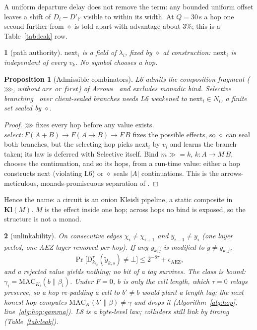 \documentclass[journal]{IEEEtran}
\newtheorem{proposition}{Proposition}
\newcommand{\namedhead}{}
\newtheorem*{namedenv}{\namedhead}
\newenvironment{lawL}[2]{\renewcommand{\namedhead}{Law #1}%
  \begin{namedenv}[#2]}{\end{namedenv}}
\newcommand{\then}{\mathbin{\ggg}}
\newcommand{\Kl}{\mathbf{Kl}}
\newcommand{\cl}{\diamond}
\newcommand{\Dec}[2]{\mathrm{D}^{#1}_{#2}}
\newcommand{\nxt}{\mathrm{next}}
\newcommand{\MAC}{\mathrm{MAC}}
\begin{document}
A uniform departure delay does not remove the term: any bounded uniform
offset leaves a shift of $D_i-D'_{i'}$ visible to within its width.  At
$Q=30$\,s a hop one second further from $\cl$ is told apart with
advantage about $3\%$; this is a Table~\ref{tab:leak} row.

\begin{lawL}{L6}{path authority}
$\nxt_i$ is a field of $\lambda_i$, fixed by $\cl$ at construction:
$\nxt_i$ is independent of every $v_k$.  No symbol chooses a hop.
\end{lawL}

\begin{proposition}[Admissible combinators]\label{prop:arrow}
L6 admits the composition fragment ($\then$, without $\mathit{arr}$ or
$\mathit{first}$) of Arrows~\cite{Hughes2000} and excludes monadic bind.
Selective branching~\cite{Mokhov2019} over client-sealed branches needs
L6 weakened to $\nxt_i\in N_i$, a finite set sealed by $\cl$.
\end{proposition}
\begin{proof}
$\then$ fixes every hop before any value exists.
$\mathit{select}:F(A+B)\to F(A\to B)\to F\,B$ fixes the possible effects,
so $\cl$ can seal both branches, but the selecting hop picks $\nxt_i$ by
$v_i$ and learns the branch taken; its law is deferred with Selective
itself.  Bind $m\gg\!\!=k$, $k:A\to M\,B$, chooses the
continuation, and so its hops, from a run-time value: either a hop
constructs $\nxt$ (violating L6) or $\cl$ seals $|A|$ continuations.  This
is the arrows-meticulous, monads-promiscuous separation of
\cite{Lindley2011}.
\end{proof}

Hence the name: a circuit is an onion Kleisli pipeline, a static
composite in $\Kl(M)$.  $M$ is the effect inside one hop; across hops
no bind is exposed, so the structure is not a monad.

\begin{lawL}{L8}{unlinkability}
On consecutive edges $\chi_i\ne\chi_{i+1}$ and $y_{i-1}\ne y_i$ (one layer
peeled, one AEZ layer removed per hop).  If any $y_{k,j}$ is modified to
$\tilde y\ne y_{k,j}$,
\[
\Pr\bigl[\Dec{\tau}{k_{c_k}}(\tilde y_{k,s})\ne\bot\bigr]\le2^{-8\tau}
+\epsilon_{\mathrm{AEZ}},
\]
and a rejected value yields nothing; no bit of a tag survives.  The class
is bound: $\gamma_i=\MAC_{K_i}(b\|\beta_i)$.  Under $F=0$, $b$ is only the
cell length, which $\tau=0$ relays preserve, so a hop re-padding a cell to
$b'\ne b$ would plant a length tag; the next honest hop computes
$\MAC_{K}(b'\|\beta)\ne\gamma$ and drops it
(Algorithm~\ref{alg:hop}, line~\ref{alg:hop:gamma}).  L8 is a
byte-level law; colluders still link by timing (Table~\ref{tab:leak}).
\end{lawL}
\end{document}
